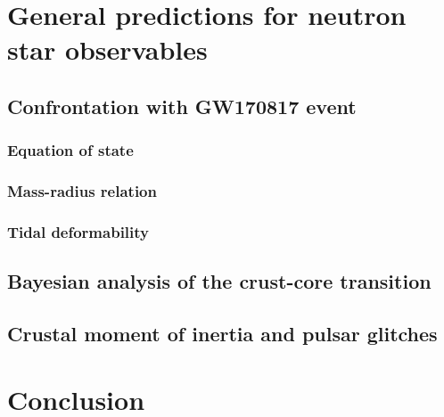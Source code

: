 
\section{General predictions for neutron star observables} %


\subsection{Confrontation with GW170817 event} %

\subsubsection{Equation of state} %

\subsubsection{Mass-radius relation} %


\subsubsection{Tidal deformability} %


\subsection{Bayesian analysis of the crust-core transition} %


\subsection{Crustal moment of inertia and pulsar glitches} %


\section{Conclusion} %

